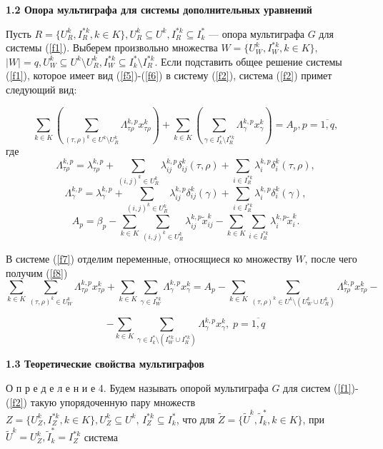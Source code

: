 \documentclass[14pt]{extarticle}%
\begin{document}
 \textbf{1.2 Опора мультиграфа для системы дополнительных уравнений}

Пусть $R=\{U^k_R, I^{*k}_R, k\in K\},U^k_R\subseteq U^k, I^{*k}_R\subseteq I^*_k$ --- опора мультиграфа $G$ для системы (\ref{f1}). Выберем произвольно множества $W=\{U^k_W, I^{*k}_W, k\in K\},$\\ $|W|=q, U^k_W\subseteq U^k\setminus U^k_R, I^{*k}_W\subseteq I^*_k\setminus I^{*k}_R$. Если подставить общее решение системы (\ref{f1}), которое имеет вид (\ref{f5})-(\ref{f6}) в систему (\ref{f2}), система (\ref{f2}) примет следующий вид:

\begin{equation}
     \sum_{k\in K}\left(\sum_{(\tau,\rho)^k\in U^k\setminus U^k_R}\Lambda^{k,p}_{\tau\rho}x^k_{\tau\rho}\right)+\sum_{k\in K}\left(\sum_{\gamma\in I^*_k\setminus I^{*k}_R}\Lambda^{k,p}_\gamma x^k_\gamma\right)=A_p, p=\overline{1,q}, \label{f7}
 \end{equation}
 где
 $$
 \Lambda^{k,p}_{\tau\rho}=\lambda^{k,p}_{\tau\rho}+\sum_{(i,j)^k\in U^k_R}\lambda^{k,p}_{ij}\delta^k_{ij}(\tau, \rho)+\sum_{i\in I^{*k}_R}\lambda^{k,p}_{i}\delta^k_{i}(\tau, \rho),
 $$
 $$
 \Lambda^{k,p}_{\gamma}=\lambda^{k,p}_{\gamma}+\sum_{(i,j)^k\in U^k_R}\lambda^{k,p}_{ij}\delta^k_{ij}(\gamma)+\sum_{i\in I^{*k}_R}\lambda^{k,p}_{i}\delta^k_{i}(\gamma),
 $$
 $$
 A_p=\beta_p-\sum_{k\in K}\sum_{(i,j)^k\in U^k_R}\lambda^{k,p}_{ij}\widetilde x^k_{ij}-\sum_{k\in K}\sum_{i\in I^{*k}_R}\lambda^{k,p}_{i}\widetilde x^k_{i}.
 $$
 
 В системе (\ref{f7}) отделим переменные, относящиеся ко множеству $W$, после чего получим (\ref{f8})
 \begin{equation}
     \sum_{k\in K}\sum_{(\tau,\rho)^k\in U^k_W}\Lambda^{k,p}_{\tau\rho}x^k_{\tau\rho}+\sum_{k\in K}\sum_{\gamma\in I^{*k}_W}\Lambda^{k,p}_\gamma x^k_\gamma=A_p- \sum_{k\in K}\sum_{(\tau,\rho)^k\in U^k\setminus(U^k_W\cup U^k_R)}\Lambda^{k,p}_{\tau\rho}x^k_{\tau\rho}-\label{f8}
 \end{equation}
 
 $$-\sum_{k\in K}\sum_{\gamma\in I^*_k\setminus(I^{*k}_W\cup I^{*k}_R)}\Lambda^{k,p}_\gamma x^k_\gamma,\; p=\overline{1,q}$$

\textbf{1.3 Теоретические свойства мультиграфов}


О п р е д е л е н и е 4.  Будем называть опорой мультиграфа $G$ для систем (\ref{f1})-(\ref{f2}) такую упорядоченную пару множеств \\$Z=\{U^k_Z, I^{*k}_Z, k\in K\}, U^k_Z\subseteq U^k,\, I^{*k}_Z\subseteq I^*_k$, что для $\widetilde Z= \{\widetilde U^k,\widetilde I^*_k, k\in K\}$, при $\widetilde U^k=U^k_Z, \widetilde I^*_k=I^{*k}_Z$ система
\end{document}
